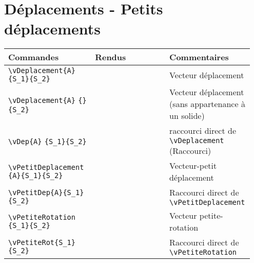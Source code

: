 \documentclass[a4paper,10pt]{article}
\newcommand{\rac}{({\color{red}Raccourci})}
\begin{document}
	\section{Déplacements - Petits déplacements}
	\noindent
	\begin{tabular}{|p{0.35\linewidth}|p{0.3\linewidth}|p{0.3\linewidth}|}
		\hline
			\textbf{Commandes}&\textbf{Rendus}&\textbf{Commentaires}
		\\\hline\hline
			\verb!\vDeplacement{A}! \verb!{S_1}{S_2}!		&	\vDeplacement{A}{S_1}{S_2}	&	Vecteur déplacement
		\\\hline
			\verb!\vDeplacement{A}! \verb!{}{S_2}!		&	\vDeplacement{A}{}{S_2}	&	Vecteur déplacement (sans appartenance à un solide)
		\\\hline
			\verb!\vDep{A}! \verb!{S_1}{S_2}!		&	\vDep{A}{S_1}{S_2}	&	raccourci direct de \verb!\vDeplacement! \rac
		\\\hline
			\verb!\vPetitDeplacement! \verb!{A}{S_1}{S_2}!		&	\vPetitDeplacement{A}{S_1}{S_2}		&	Vecteur-petit déplacement
		\\\hline
			\verb!\vPetitDep{A}{S_1}! \verb!{S_2}!		&	\vPetitDep{A}{S_1}{S_2}		&	Raccourci direct de \verb!\vPetitDeplacement!
		\\\hline
			\verb!\vPetiteRotation!	 \verb!{S_1}{S_2}!	&	\vPetiteRotation{S_1}{S_2}	&	Vecteur petite-rotation	
		\\\hline
			\verb!\vPetiteRot{S_1}! \verb!{S_2}!		&	\vPetiteRot{S_1}{S_2}		&	Raccourci direct de \verb!\vPetiteRotation!
		\\\hline
	\end{tabular}
\end{document}
